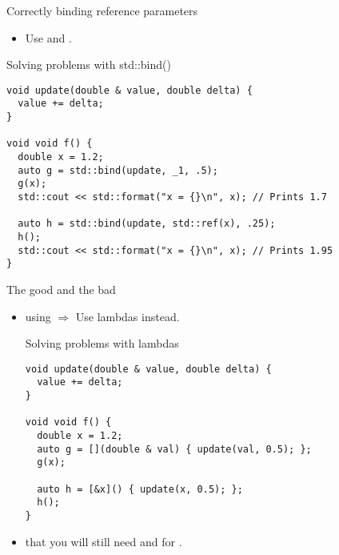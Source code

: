 \begin{frame}[t,fragile]{Correctly binding reference parameters}
\begin{itemize}
  \item Use  and .
\end{itemize}

\begin{block}{Solving problems with std::bind()}
\begin{lstlisting}[basicstyle=\mode<presentation>{\tiny}]
void update(double & value, double delta) {
  value += delta;
}

void void f() {
  double x = 1.2; 
  auto g = std::bind(update, _1, .5);
  g(x);
  std::cout << std::format("x = {}\n", x); // Prints 1.7

  auto h = std::bind(update, std::ref(x), .25);
  h();
  std::cout << std::format("x = {}\n", x); // Prints 1.95
}
\end{lstlisting}
\end{block}
\end{frame}

\begin{frame}[t,fragile]{The good and the bad}
\begin{itemize}
  \item {} using  $\Rightarrow$ Use lambdas instead.
\begin{block}{Solving problems with lambdas}
\begin{lstlisting}[basicstyle=\mode<presentation>{\tiny}]
void update(double & value, double delta) {
  value += delta;
}

void void f() {
  double x = 1.2; 
  auto g = [](double & val) { update(val, 0.5); };
  g(x);

  auto h = [&x]() { update(x, 0.5); };
  h();
}
\end{lstlisting}
\end{block}

  \pause
  \item {} that you will still need  and 
        for .

\end{itemize}
\end{frame}
